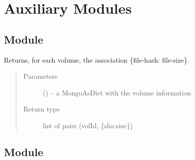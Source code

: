 \documentclass[letterpaper,10pt,english]{sphinxmanual}
\begin{document}
\section{Auxiliary Modules}
\label{\detokenize{index:auxiliary-modules}}

\subsection{Module }
\label{\detokenize{index:module-misctools}}\label{\detokenize{index:module-fsbackup.miscTools}}\label{\detokenize{index:module-miscTools}}

\begin{fulllineitems}
\label{\detokenize{index:fsbackup.miscTools.buildVolumeInfoList}}
Returns, for each volume, the association \{file-hash: file-size\}.
\begin{quote}\begin{description}
\item[{Parameters}] \leavevmode
{} () -- a MongoAsDict with the volume information

\item[{Return type}] \leavevmode
list of pairs (volId, \{sha:size\})

\end{description}\end{quote}

\end{fulllineitems}



\subsection{Module }
\label{\detokenize{index:module-filetools}}\label{\detokenize{index:module-fsbackup.fileTools}}\label{\detokenize{index:module-fileTools}}
\end{document}
